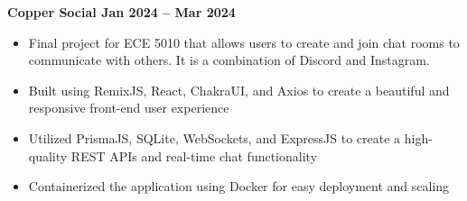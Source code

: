 \textbf{{Copper Social} \hfill Jan 2024 -- Mar 2024} \par
\begin{itemize}
	\item Final project for ECE 5010 that allows users to create and join chat rooms to communicate with others. It is a combination of Discord and Instagram.
    \item Built using RemixJS, React, ChakraUI, and Axios to create a beautiful and responsive front-end user experience
    \item Utilized PrismaJS, SQLite, WebSockets, and ExpressJS to create a high-quality REST APIs and real-time chat functionality
    \item Containerized the application using Docker for easy deployment and scaling
\end{itemize}\vspace{0.1cm}\par
